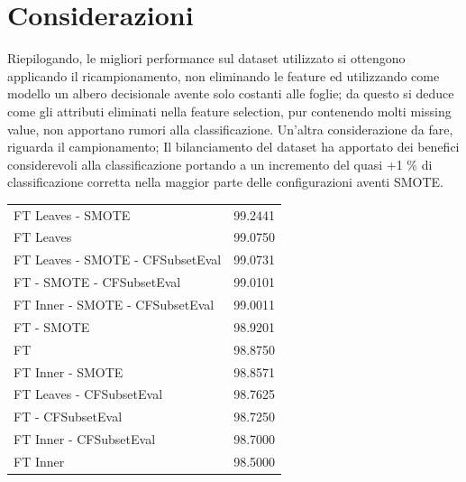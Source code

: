 \section{Considerazioni}
Riepilogando, le migliori performance sul dataset utilizzato si ottengono applicando il ricampionamento, non eliminando le feature ed utilizzando come modello un albero decisionale avente solo costanti alle foglie; da questo si deduce come gli attributi eliminati nella feature selection, pur contenendo molti missing value, non apportano rumori alla classificazione.
Un'altra considerazione da fare, riguarda il campionamento; Il bilanciamento del dataset ha apportato dei benefici considerevoli alla classificazione portando a un incremento del quasi +1 \% di classificazione corretta nella maggior parte delle configurazioni aventi SMOTE.

\begin{table}[htbp]
	\begin{tabular}{l r}
		FT Leaves - SMOTE & 99.2441 \\
		FT Leaves & 99.0750 \\
		FT Leaves - SMOTE - CFSubsetEval & 99.0731 \\
		FT - SMOTE - CFSubsetEval & 99.0101 \\
		FT Inner - SMOTE - CFSubsetEval & 99.0011 \\		
		FT - SMOTE & 98.9201 \\
		FT & 98.8750 \\
		FT Inner - SMOTE & 98.8571 \\
		FT Leaves - CFSubsetEval & 98.7625 \\ 
		FT - CFSubsetEval & 98.7250 \\
		FT Inner - CFSubsetEval & 98.7000 \\
		FT Inner & 98.5000 \\
	\end{tabular}
\end{table}